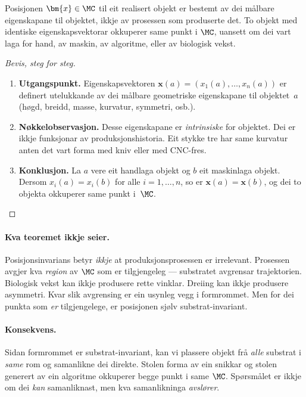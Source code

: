 \begin{satmark}[Posisjonsinvarians]\label{thm:L.7.2}
Posisjonen $\bm{x} \in \MC$ til eit realisert objekt er bestemt
av dei målbare eigenskapane til objektet, ikkje av prosessen som
produserte det. To objekt med identiske eigenskapsvektorar
okkuperer same punkt i $\MC$, uansett om dei vart laga for hand,
av maskin, av algoritme, eller av biologisk vekst.
\end{satmark}

\begin{proof}[Bevis, steg for steg]
\begin{enumerate}
  \item \textbf{Utgangspunkt.}\;
    Eigenskapsvektoren $\bm{x}(a) = (x_1(a), \ldots, x_n(a))$ er
    definert utelukkande av dei målbare geometriske eigenskapane
    til objektet~$a$ (høgd, breidd, masse, kurvatur, symmetri, osb.).
  \item \textbf{Nøkkelobservasjon.}\;
    Desse eigenskapane er \emph{intrinsiske} for objektet. Dei er
    ikkje funksjonar av produksjonshistoria. Eit stykke tre har
    same kurvatur anten det vart forma med kniv eller med
    CNC-fres.
  \item \textbf{Konklusjon.}\;
    La $a$ vere eit handlaga objekt og $b$ eit maskinlaga objekt.
    Dersom $x_i(a) = x_i(b)$ for alle $i = 1, \ldots, n$, so er
    $\bm{x}(a) = \bm{x}(b)$, og dei to objekta okkuperer same
    punkt i~$\MC$. \qedhere
\end{enumerate}
\end{proof}

\paragraph{Kva teoremet ikkje seier.}
Posisjonsinvarians betyr \emph{ikkje} at produksjonsprosessen er
irrelevant. Prosessen avgjer kva \emph{region} av $\MC$ som er
tilgjengeleg --- substratet avgrensar trajektorien. Biologisk vekst
kan ikkje produsere rette vinklar. Dreiing kan ikkje produsere
asymmetri. Kvar slik avgrensing er ein usynleg vegg i formrommet.
Men for dei punkta som \emph{er} tilgjengelege, er posisjonen
sjølv substrat-invariant.

\paragraph{Konsekvens.}
Sidan formrommet er substrat-invariant, kan vi plassere objekt frå
\emph{alle} substrat i \emph{same} rom og samanlikne dei direkte.
Stolen forma av ein snikkar og stolen generert av ein algoritme
okkuperer begge punkt i same $\MC$. Spørsmålet er ikkje om dei
\emph{kan} samanliknast, men kva samanlikninga \emph{avslører}.



